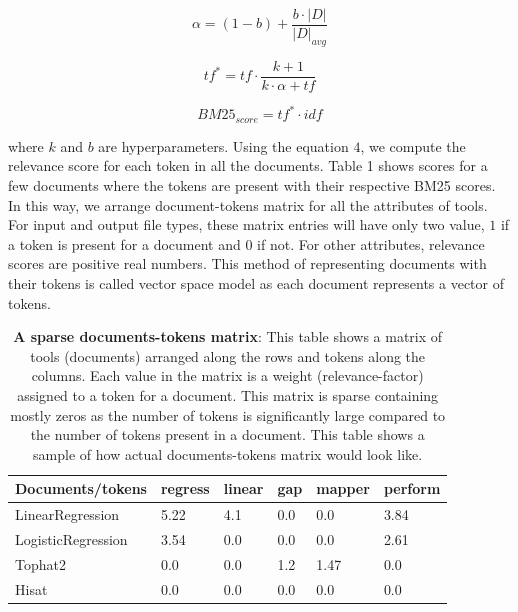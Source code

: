 \begin{equation}
\alpha = (1-b) + \frac{b \cdot |D|}{|D|_{avg}}
\end{equation}

\begin{equation}
tf^* = tf \cdot \frac{k+1}{k \cdot \alpha + tf}
\end{equation}

\begin{equation}
BM25_{score} =tf^* \cdot idf
\end{equation}

where $k$ and $b$ are hyperparameters. Using the equation $4$, we compute the relevance score for each token in all the documents. Table 1 shows scores for a few documents where the tokens are present with their respective BM25 scores. In this way, we arrange document-tokens matrix for all the attributes of tools. For input and output file types, these matrix entries will have only two value, $1$ if a token is present for a document and $0$ if not. For other attributes, relevance scores are positive real numbers. This method of representing documents with their tokens is called vector space model as each document represents a vector of tokens.

\begin{table}[ht]
\begin{center}
    \begin{tabular}{|l|l|l|l|l|l|}
        \hline
        Documents/tokens   & regress & linear & gap & mapper & perform \\ \hline
        LinearRegression   & 5.22 & 4.1 & 0.0 & 0.0  & 3.84 \\ \hline
        LogisticRegression & 3.54 & 0.0 & 0.0 & 0.0  & 2.61 \\ \hline
        Tophat2            & 0.0  & 0.0 & 1.2 & 1.47 & 0.0 \\ \hline
        Hisat              & 0.0  & 0.0 & 0.0 & 0.0  & 0.0 \\ \hline
    \end{tabular}
    \end{center}
    \caption[A sparse documents-tokens matrix]{\textbf{A sparse documents-tokens matrix}: This table shows a matrix of tools (documents) arranged along the rows and tokens along the columns. Each value in the matrix is a weight (relevance-factor) assigned to a token for a document. This matrix is sparse containing mostly zeros as the number of tokens is significantly large compared to the number of tokens present in a document. This table shows a sample of how actual documents-tokens matrix would look like.}
    \label{tab:accuracy}
\end{table}

